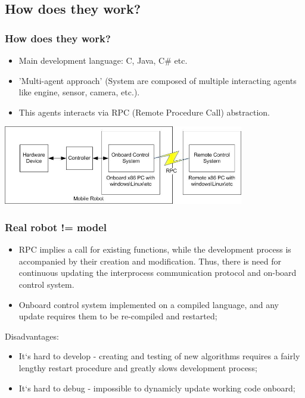 \documentclass{beamer}
\begin{document}
\subsection{How does they work?}
\begin{frame}
\frametitle{How does they work?}
\begin{itemize}
	\item<1>Main development language: C, Java, C\# etc.
	\item<1>'Multi-agent approach' (System are composed of multiple interacting agents like engine, sensor, camera, etc.).
	\item<1>This agents interacts via RPC (Remote Procedure Call) abstraction.
\end{itemize}
\includegraphics[width=10.5cm]{rpc0.jpg}
\end{frame}


\begin{frame}
\frametitle{Real robot != model}
\begin{itemize}
\item<1>RPC implies a call for existing functions, while the development process is accompanied by their creation and
modification. Thus, there is need for continuous updating the interprocess communication protocol and on-board control 
system.
\item<1>Onboard control system implemented on a compiled language, and any update requires them to be re-compiled and
restarted;
\end{itemize}
Disadvantages: 
\begin{itemize}
\item<1>It`s hard to develop - creating and testing of new algorithms requires a fairly lengthy restart procedure 
 and greatly slows development process;
\item<1>It`s hard to debug - impossible to dynamicly update working code onboard;
\end{itemize}
\end{frame}
\end{document}
